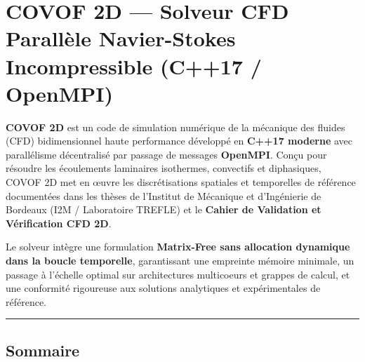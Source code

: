 \documentclass[
  french,
]{article}
\author{}
\date{}
\makeatletter
\newcommand*\pandocbounded[1]{%
  \sbox\pandoc@box{#1}%
  \Gscale@div\@tempa{\textheight}{\dimexpr\ht\pandoc@box+\dp\pandoc@box\relax}%
  \Gscale@div\@tempb{\linewidth}{\wd\pandoc@box}%
  \ifdim\@tempb\p@<\@tempa\p@\let\@tempa\@tempb\fi%
  \ifdim\@tempa\p@<\p@\scalebox{\@tempa}{\usebox\pandoc@box}%
  \else\usebox{\pandoc@box}%
  \fi%
}
\makeatother
\begin{document}
\section{COVOF 2D --- Solveur CFD Parallèle Navier-Stokes Incompressible
(C++17 /
OpenMPI)}\label{covof-2d-solveur-cfd-paralluxe8le-navier-stokes-incompressible-c17-openmpi}

\href{https://en.wikipedia.org/wiki/C\%2B\%2B17}{\pandocbounded{}}
\href{https://www.open-mpi.org/}{\pandocbounded{}}
\href{docs/VALIDATION_GUIDE.md}{\pandocbounded{}}
\href{LICENSE}{\pandocbounded{}}

\textbf{COVOF 2D} est un code de simulation numérique de la mécanique
des fluides (CFD) bidimensionnel haute performance développé en
\textbf{C++17 moderne} avec parallélisme décentralisé par passage de
messages \textbf{OpenMPI}. Conçu pour résoudre les écoulements
laminaires isothermes, convectifs et diphasiques, COVOF 2D met en œuvre
les discrétisations spatiales et temporelles de référence documentées
dans les thèses de l'Institut de Mécanique et d'Ingénierie de Bordeaux
(I2M / Laboratoire TREFLE) et le \textbf{Cahier de Validation et
Vérification CFD 2D}.

Le solveur intègre une formulation \textbf{Matrix-Free sans allocation
dynamique dans la boucle temporelle}, garantissant une empreinte mémoire
minimale, un passage à l'échelle optimal sur architectures multicoeurs
et grappes de calcul, et une conformité rigoureuse aux solutions
analytiques et expérimentales de référence.

\begin{center}\rule{0.5\linewidth}{0.5pt}\end{center}

\subsection{Sommaire}\label{sommaire}
\end{document}
